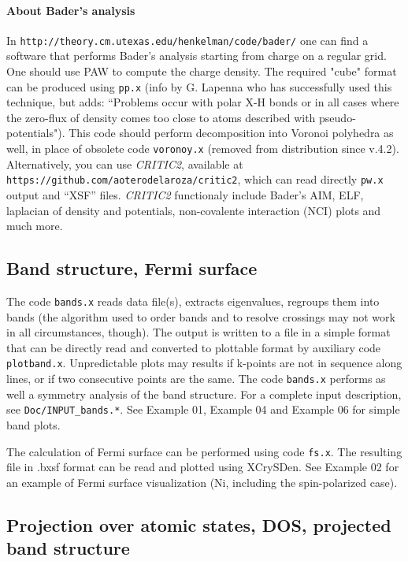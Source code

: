 \documentclass[12pt,a4paper]{article}
\begin{document}
\paragraph{About Bader's analysis}
In \texttt{http://theory.cm.utexas.edu/henkelman/code/bader/} 
one can find a software that performs Bader's analysis starting 
from charge on a regular grid. One should use PAW to compute the
charge density. The required "cube" format can be produced using 
\texttt{pp.x} (info by G. Lapenna who has successfully used this 
technique, but adds: ``Problems occur with polar X-H bonds or in
all cases where the zero-flux of density comes too close to atoms 
described with pseudo-potentials"). This code should perform 
decomposition into Voronoi polyhedra as well, in place of obsolete
code  \texttt{voronoy.x} (removed from distribution since v.4.2).
Alternatively, you can use \textsl{CRITIC2}, available at
\texttt{https://github.com/aoterodelaroza/critic2}, which can
read directly \texttt{pw.x} output and ``XSF'' files. \textsl{CRITIC2}
functionaly include Bader's AIM, ELF, laplacian of density and
potentials, non-covalente interaction (NCI) plots and much more.

\subsection{Band structure, Fermi surface}

The code \texttt{bands.x} reads data file(s), extracts eigenvalues,
regroups them into bands (the algorithm used to order bands and to resolve
crossings may not work in all circumstances, though). The output is written
to a file in a simple format that can be directly read and converted to
plottable format by auxiliary code
\texttt{plotband.x}. Unpredictable plots may results if k-points are not 
in sequence along lines, or if two consecutive points are the same. 
The code \texttt{bands.x} performs as well a 
symmetry analysis of the band structure. For a complete input description,
see \texttt{Doc/INPUT\_bands.*}. See Example 01, Example 04 and Example 06 
for simple band plots.

The calculation of Fermi surface can be performed using code \texttt{fs.x}.
The resulting file in .bxsf format can be read and plotted
using XCrySDen. See Example 02 for an example of Fermi surface 
visualization (Ni, including the spin-polarized case).

\subsection{Projection over atomic states, DOS, projected band structure}
\end{document}

